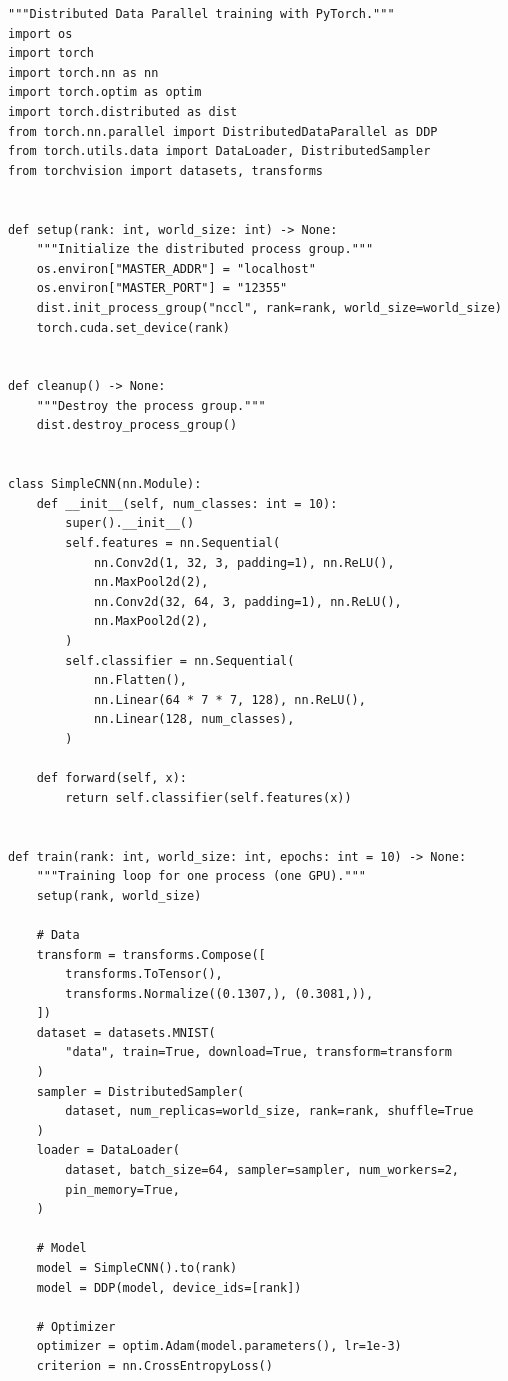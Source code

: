 \begin{codeblock}[title=\textbf{Entra\^inement DDP complet}]
\begin{verbatim}
"""Distributed Data Parallel training with PyTorch."""
import os
import torch
import torch.nn as nn
import torch.optim as optim
import torch.distributed as dist
from torch.nn.parallel import DistributedDataParallel as DDP
from torch.utils.data import DataLoader, DistributedSampler
from torchvision import datasets, transforms


def setup(rank: int, world_size: int) -> None:
    """Initialize the distributed process group."""
    os.environ["MASTER_ADDR"] = "localhost"
    os.environ["MASTER_PORT"] = "12355"
    dist.init_process_group("nccl", rank=rank, world_size=world_size)
    torch.cuda.set_device(rank)


def cleanup() -> None:
    """Destroy the process group."""
    dist.destroy_process_group()


class SimpleCNN(nn.Module):
    def __init__(self, num_classes: int = 10):
        super().__init__()
        self.features = nn.Sequential(
            nn.Conv2d(1, 32, 3, padding=1), nn.ReLU(),
            nn.MaxPool2d(2),
            nn.Conv2d(32, 64, 3, padding=1), nn.ReLU(),
            nn.MaxPool2d(2),
        )
        self.classifier = nn.Sequential(
            nn.Flatten(),
            nn.Linear(64 * 7 * 7, 128), nn.ReLU(),
            nn.Linear(128, num_classes),
        )

    def forward(self, x):
        return self.classifier(self.features(x))


def train(rank: int, world_size: int, epochs: int = 10) -> None:
    """Training loop for one process (one GPU)."""
    setup(rank, world_size)

    # Data
    transform = transforms.Compose([
        transforms.ToTensor(),
        transforms.Normalize((0.1307,), (0.3081,)),
    ])
    dataset = datasets.MNIST(
        "data", train=True, download=True, transform=transform
    )
    sampler = DistributedSampler(
        dataset, num_replicas=world_size, rank=rank, shuffle=True
    )
    loader = DataLoader(
        dataset, batch_size=64, sampler=sampler, num_workers=2,
        pin_memory=True,
    )

    # Model
    model = SimpleCNN().to(rank)
    model = DDP(model, device_ids=[rank])

    # Optimizer
    optimizer = optim.Adam(model.parameters(), lr=1e-3)
    criterion = nn.CrossEntropyLoss()


\end{verbatim}
\end{codeblock}
